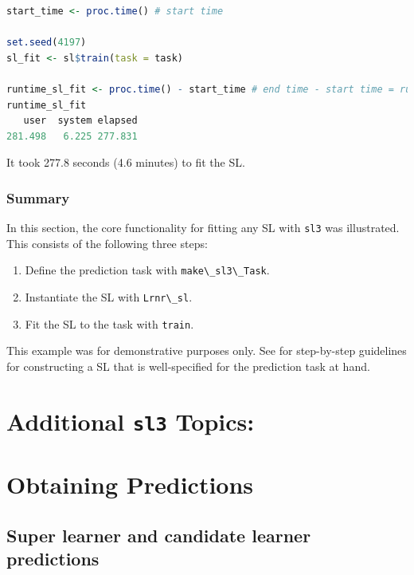 \documentclass[
  12pt, krantz2,
]{krantz}
\newcommand{\passthrough}[1]{#1}
\providecommand{\tightlist}{%
  \setlength{\itemsep}{0pt}\setlength{\parskip}{0pt}}
\newcommand{\1}{\mathbbm{1}}
\theoremstyle{definition}
\theoremstyle{definition}
\theoremstyle{definition}
\theoremstyle{definition}
\theoremstyle{remark}
\begin{document}
\begin{lstlisting}[language=R]
start_time <- proc.time() # start time

set.seed(4197)
sl_fit <- sl$train(task = task)

runtime_sl_fit <- proc.time() - start_time # end time - start time = run time
runtime_sl_fit
   user  system elapsed 
281.498   6.225 277.831 
\end{lstlisting}

It took 277.8 seconds
(4.6 minutes) to fit the SL.

\hypertarget{summary}{%
\subsubsection*{Summary}\label{summary}}


In this section, the core functionality for fitting any SL with \passthrough{\lstinline!sl3!} was
illustrated. This consists of the following three steps:

\begin{enumerate}
\def\labelenumi{\arabic{enumi}.}
\tightlist
\item
  Define the prediction task with \passthrough{\lstinline!make\_sl3\_Task!}.
\item
  Instantiate the SL with \passthrough{\lstinline!Lrnr\_sl!}.
\item
  Fit the SL to the task with \passthrough{\lstinline!train!}.
\end{enumerate}

This example was for demonstrative purposes only. See \citet{rvp2022super} for
step-by-step guidelines for constructing a SL that is well-specified for the
prediction task at hand.

\hypertarget{additional-sl3-topics}{%
\section*{\texorpdfstring{Additional \texttt{sl3} Topics:}{Additional sl3 Topics:}}\label{additional-sl3-topics}}


\hypertarget{obtaining-predictions}{%
\section{Obtaining Predictions}\label{obtaining-predictions}}

\hypertarget{super-learner-and-candidate-learner-predictions}{%
\subsection{Super learner and candidate learner predictions}\label{super-learner-and-candidate-learner-predictions}}
\end{document}
